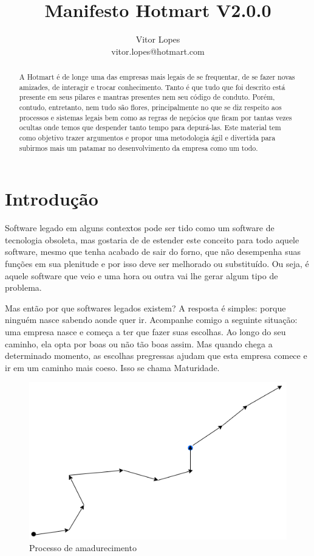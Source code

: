 \documentclass[a4paper,twoside]{article}
\title{\textbf{Manifesto Hotmart V2.0.0}}
\author{Vitor Lopes \\ vitor.lopes@hotmart.com}
\begin{document}
\maketitle
\begin{abstract}
    A Hotmart é de longe uma das empresas mais legais de se frequentar, de se fazer novas amizades, de interagir e trocar conhecimento. Tanto é que tudo que foi descrito está presente em seus pilares e mantras presentes nem seu código de conduto. Porém, contudo, entretanto, nem tudo são flores, principalmente no que se diz respeito aos processos e sistemas legais bem como as regras de negócios que ficam por tantas vezes ocultas onde temos que despender tanto tempo para depurá-las.
    Este material tem como objetivo trazer argumentos e propor uma metodologia ágil e divertida para subirmos mais um patamar no desenvolvimento da empresa como um todo.
\end{abstract}
\section{Introdução}
Software legado em alguns contextos pode ser tido como um software de tecnologia obsoleta, mas gostaria de de estender este conceito para todo aquele software, mesmo que tenha acabado de sair do forno, que não desempenha suas funções em sua plenitude e por isso deve ser melhorado ou substituído. Ou seja, é aquele software que veio e uma hora ou outra vai lhe gerar algum tipo de problema. 

Mas então por que softwares legados existem? A resposta é simples: porque ninguém nasce sabendo aonde quer ir. Acompanhe comigo a seguinte situação: uma empresa nasce e começa a ter que fazer suas escolhas. Ao longo do seu caminho, ela opta por boas ou não tão boas assim. Mas quando chega a determinado momento, as escolhas pregressas ajudam que esta empresa comece e ir em um caminho mais coeso. Isso se chama Maturidade.

\begin{figure}[H]
    \centering
    \includegraphics[scale=0.60,keepaspectratio=true]{images/01.png}
    \caption{Processo de amadurecimento}
    \label{mature_process}
\end{figure}
\end{document}
